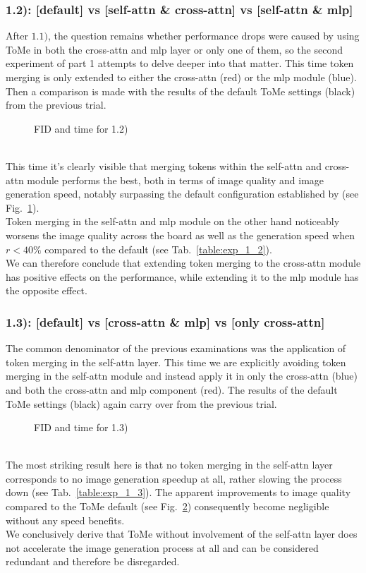 \subsubsection*{1.2): [default] vs [self-attn \& cross-attn] vs [self-attn \& mlp]}
After \(1.1)\), the question remains whether performance drops were caused by using ToMe in both the cross-attn and mlp layer or only one of them, so the second experiment of part 1 attempts to delve deeper into that matter. This time token merging is only extended to either the cross-attn (red) or the mlp module (blue). Then a comparison is made with the results of the default ToMe settings (black) from the previous trial.
\begin{figure}[!htb]
    
    
\caption{FID and time for 1.2)}
\label{fig:exp_1_2}
\end{figure}\\
This time it's clearly visible that merging tokens within the self-attn and cross-attn module performs the best, both in terms of image quality and image generation speed, notably surpassing the default configuration established by \cite{bolya2023tomesd} (see Fig.~\ref{fig:exp_1_2}).\\
Token merging in the self-attn and mlp module on the other hand noticeably worsens the image quality across the board as well as the generation speed when $r<40\%$ compared to the default (see Tab.~\ref{table:exp_1_2}).\\
We can therefore conclude that extending token merging to the cross-attn module has positive effects on the performance, while extending it to the mlp module has the opposite effect.



\newpage
\subsubsection*{1.3): [default] vs [cross-attn \& mlp] vs [only cross-attn]}
The common denominator of the previous examinations was the application of token merging in the self-attn layer. This time we are explicitly avoiding token merging in the self-attn module and instead apply it in only the cross-attn (blue) and both the cross-attn and mlp component (red).
The results of the default ToMe settings (black) again carry over from the previous trial.
\begin{figure}[!htb]
    
    
\caption{FID and time for 1.3)}
\label{fig:exp_1_3}
\end{figure}\\
The most striking result here is that no token merging in the self-attn layer corresponds to no image generation speedup at all, rather slowing the process down (see Tab.~\ref{table:exp_1_3}). 
The apparent improvements to image quality compared to the ToMe default (see Fig.~\ref{fig:exp_1_3}) consequently become negligible without any speed benefits.\\
We conclusively derive that ToMe without involvement of the self-attn layer does not accelerate the image generation process at all and can be considered redundant and therefore be disregarded.




